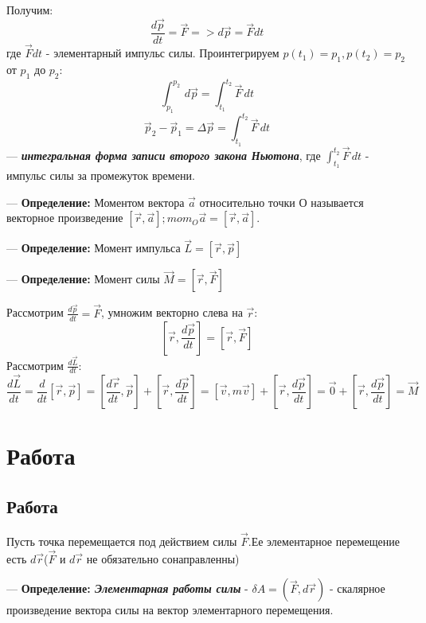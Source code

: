 \documentclass[12pt,a4paper]{report}
\begin{document}
Получим:
\[ \frac{d\vec p}{dt} = \vec F => d\vec p = \vec F dt\]
где $\vec Fdt$ - элементарный импульс силы. Проинтегрируем $p(t_1) = p_1, p(t_2) = p_2$ от $p_1$ до $p_2$:
\[ \int_{p_1}^{p_2}\,d\vec p  = \int_{t_1}^{t_2} \vec F \,dt \]
\[\vec p_2 - \vec p_1 = \Delta \vec p = \int_{t_1}^{t_2} \vec F \,dt\]
--- \textbf{\textit{интегральная форма записи второго закона Ньютона}}, где $\int_{t_1}^{t_2} \vec F \,dt$ - импульс силы за промежуток времени.

\vspace{5px}

--- \textbf{Определение:} Моментом вектора $\vec a$ относительно точки О называется векторное произведение $[\vec r, \vec a]; mom_O \vec a = [\vec r, \vec a]$.

\vspace{5px}

--- \textbf{Определение:} Момент импульса $\vec L = [\vec r, \vec p]$

\vspace{5px}

--- \textbf{Определение:} Момент силы $\vec M = [\vec r, \vec F]$

\vspace{5px}

Рассмотрим $\frac{d\vec p}{dt} = \vec F$, умножим векторно слева на $\vec r$:
\[ [\vec r, \frac{d \vec p}{dt}] = [\vec r, \vec F]\]
Рассмотрим $\frac{d\vec L}{dt}$:
\[\frac{d\vec L}{dt} = \frac{d}{dt}[\vec r, \vec p] = [\frac{d\vec r}{dt}, \vec p] + [\vec r, \frac{d \vec p}{dt}] = [\vec v, m \vec v] + [\vec r, \frac{d\vec p}{dt}] = \vec 0 + [\vec r, \frac{d\vec p}{dt}] = \vec M\]

\section{Работа}
\subsection{Работа}
Пусть точка перемещается под действием силы $\vec F$.Ее элементарное перемещение есть $d\vec r$($\vec F$ и $d\vec r$ не обязательно сонаправленны)

\vspace{3px}

--- \textbf{Определение: \textit{Элементарная работы силы}} - $\delta A = (\vec F, d\vec r)$ - скалярное произведение вектора силы на вектор элементарного перемещения.
\end{document}
